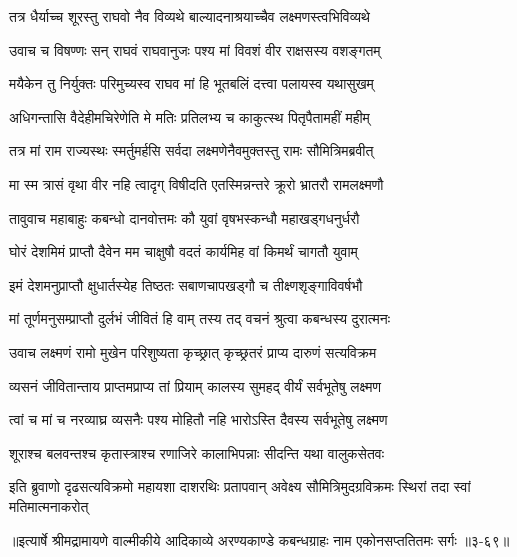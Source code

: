 \twolineshloka
{तत्र धैर्याच्च शूरस्तु राघवो नैव विव्यथे}
{बाल्यादनाश्रयाच्चैव लक्ष्मणस्त्वभिविव्यथे} %

\twolineshloka
{उवाच च विषण्णः सन् राघवं राघवानुजः}
{पश्य मां विवशं वीर राक्षसस्य वशङ्गतम्} %

\twolineshloka
{मयैकेन तु निर्युक्तः परिमुच्यस्व राघव}
{मां हि भूतबलिं दत्त्वा पलायस्व यथासुखम्} %

\twolineshloka
{अधिगन्तासि वैदेहीमचिरेणेति मे मतिः}
{प्रतिलभ्य च काकुत्स्थ पितृपैतामहीं महीम्} %

\twolineshloka
{तत्र मां राम राज्यस्थः स्मर्तुमर्हसि सर्वदा}
{लक्ष्मणेनैवमुक्तस्तु रामः सौमित्रिमब्रवीत्} %

\twolineshloka
{मा स्म त्रासं वृथा वीर नहि त्वादृग् विषीदति}
{एतस्मिन्नन्तरे क्रूरो भ्रातरौ रामलक्ष्मणौ} %

\twolineshloka
{तावुवाच महाबाहुः कबन्धो दानवोत्तमः}
{कौ युवां वृषभस्कन्धौ महाखड्गधनुर्धरौ} %

\twolineshloka
{घोरं देशमिमं प्राप्तौ दैवेन मम चाक्षुषौ}
{वदतं कार्यमिह वां किमर्थं चागतौ युवाम्} %

\twolineshloka
{इमं देशमनुप्राप्तौ क्षुधार्तस्येह तिष्ठतः}
{सबाणचापखड्गौ च तीक्ष्णशृङ्गाविवर्षभौ} %

\twolineshloka
{मां तूर्णमनुसम्प्राप्तौ दुर्लभं जीवितं हि वाम्}
{तस्य तद् वचनं श्रुत्वा कबन्धस्य दुरात्मनः} %

\twolineshloka
{उवाच लक्ष्मणं रामो मुखेन परिशुष्यता}
{कृच्छ्रात् कृच्छ्रतरं प्राप्य दारुणं सत्यविक्रम} %

\twolineshloka
{व्यसनं जीवितान्ताय प्राप्तमप्राप्य तां प्रियाम्}
{कालस्य सुमहद् वीर्यं सर्वभूतेषु लक्ष्मण} %

\twolineshloka
{त्वां च मां च नरव्याघ्र व्यसनैः पश्य मोहितौ}
{नहि भारोऽस्ति दैवस्य सर्वभूतेषु लक्ष्मण} %

\twolineshloka
{शूराश्च बलवन्तश्च कृतास्त्राश्च रणाजिरे}
{कालाभिपन्नाः सीदन्ति यथा वालुकसेतवः} %

\twolineshloka
{इति ब्रुवाणो दृढसत्यविक्रमो महायशा दाशरथिः प्रतापवान्}
{अवेक्ष्य सौमित्रिमुदग्रविक्रमः स्थिरां तदा स्वां मतिमात्मनाकरोत्} %


॥इत्यार्षे श्रीमद्रामायणे वाल्मीकीये आदिकाव्ये अरण्यकाण्डे कबन्धग्राहः नाम एकोनसप्ततितमः सर्गः ॥३-६९॥
